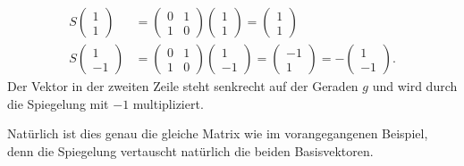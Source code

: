 \begin{align*}
S
\begin{pmatrix}1\\1\end{pmatrix}
&=
\begin{pmatrix}0&1\\1&0\end{pmatrix}
\begin{pmatrix}1\\1\end{pmatrix}
=
\begin{pmatrix}1\\1\end{pmatrix}
\\
S
\begin{pmatrix}1\\-1\end{pmatrix}
&=
\begin{pmatrix}0&1\\1&0\end{pmatrix}
\begin{pmatrix}1\\-1\end{pmatrix}
=
\begin{pmatrix}-1\\1\end{pmatrix}
=
-
\begin{pmatrix}1\\-1\end{pmatrix}.
\end{align*}
Der Vektor in der zweiten Zeile steht senkrecht auf der Geraden $g$ 
und wird durch die Spiegelung mit $-1$ multipliziert.

Natürlich ist dies genau die gleiche Matrix wie im vorangegangenen
Beispiel, denn die Spiegelung vertauscht natürlich die beiden
Basisvektoren.

